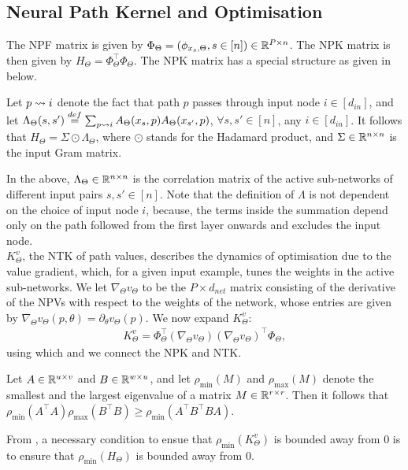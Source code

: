 \subsection{Neural Path Kernel and Optimisation}
The NPF matrix is given by $\Phi_{\Theta}=(\phi_{x_s,\Theta},s\in[n])\in\mathbb{R}^{P\times n}$. The NPK matrix is then given by $H_{\Theta}=\Phi^\top_{\Theta}\Phi_{\Theta}$. The NPK matrix has a special structure as given in  below.
\begin{lemma}\label{lm:npk}
Let $p\rightsquigarrow i$ denote the fact that path $p$ passes through input node $i\in[d_{in}]$, and let $\Lambda_{\Theta}(s,s')\stackrel{def}{=}\sum_{p\rightsquigarrow i} A_{\Theta}(x_s,p) A_{\Theta}(x_{s'},p)$, $\forall s,s'\in[n]$, any $i\in [d_{in}]$. It follows that $H_{\Theta}= \Sigma\odot\Lambda_{\Theta}$, where $\odot$ stands for the Hadamard product, and $\Sigma \in \mathbb{R}^{n\times n}$ is the input Gram matrix.
\end{lemma}
In the  above, $\Lambda_{\Theta}\in\mathbb{R}^{n\times n}$ is the correlation matrix of the active sub-networks of different input pairs $s,s'\in[n]$. Note that the definition of $\Lambda$ is not dependent on the choice of input node $i$, because, the terms inside the summation depend only on the path followed from the first layer onwards and excludes the input node.\\
$K^v_{\Theta}$, the NTK of path values, describes the dynamics of optimisation due to the value gradient, which, for a given input example, tunes the weights in the active sub-networks. We let $\nabla_{\Theta}v_{\Theta}$ to be the $P\times d_{net}$ matrix consisting of the derivative of the NPVs with respect to the weights of the network, whose entries are given by $\nabla_{\Theta}v_{\Theta}(p,\theta)=\partial_{\theta}v_{\Theta}(p)$. We now expand $K^v_{\Theta}$:
\begin{align}\label{eq:kv}
K^{v}_{\Theta}=\Phi^\top_{\Theta}(\nabla_{\Theta} v_{\Theta})(\nabla_{\Theta} v_{\Theta})^\top \Phi_{\Theta},
\end{align}
using which and  we connect the NPK and NTK.
\begin{lemma}\label{lm:nec}
Let $A\in\mathbb{R}^{u\times v}$ and $B\in\mathbb{R}^{w\times u}$, and let $\rho_{\min}(M)$ and $\rho_{\max}(M)$ denote the smallest and the largest eigenvalue of a matrix $M\in\mathbb{R}^{r\times r}$. Then it follows that $\rho_{\min}(A^\top A)\rho_{\max}(B^\top B)\geq \rho_{\min}(A^\top B^\top BA)$.
\end{lemma}
From , a necessary condition to ensue that $\rho_{\min}(K^v_{\Theta})$ is bounded away from $0$ is to ensure that $\rho_{\min}(H_{\Theta})$ is bounded away from $0$.\\
